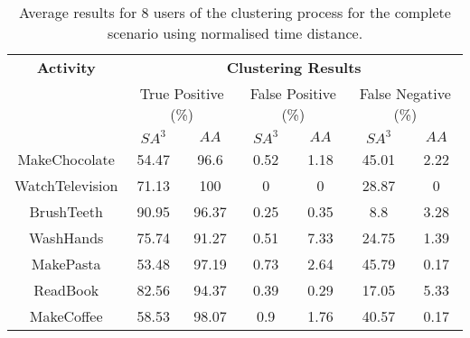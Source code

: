 \begin{table}[htbp]\scriptsize
  \begin{center}
        \begin{tabular}{ccccccc}
            \hline            
            \textbf{Activity} & \multicolumn{6}{c}{\textbf{Clustering Results}} \\
             & \multicolumn{2}{c}{True Positive (\%)} & \multicolumn{2}{c}{False Positive (\%)} & \multicolumn{2}{c}{False Negative (\%)} \\
             & $SA^3$ & $AA$ & $SA^3$ & $AA$ & $SA^3$ & $AA$ \\
            \hline
            MakeChocolate   & 54.47 & 96.6  & 0.52 & 1.18 & 45.01 & 2.22 \\
	    WatchTelevision & 71.13 & 100   & 0    & 0    & 28.87 & 0    \\
	    BrushTeeth      & 90.95 & 96.37 & 0.25 & 0.35 & 8.8   & 3.28 \\
	    WashHands       & 75.74 & 91.27 & 0.51 & 7.33 & 24.75 & 1.39 \\
	    MakePasta       & 53.48 & 97.19 & 0.73 & 2.64 & 45.79 & 0.17 \\
	    ReadBook        & 82.56 & 94.37 & 0.39 & 0.29 & 17.05 & 5.33 \\
	    MakeCoffee      & 58.53 & 98.07 & 0.9  & 1.76 & 40.57 & 0.17 \\
            \hline
        \end{tabular}
        \caption{Average results for 8 users of the clustering process for the complete scenario using normalised time distance.}
        \label{tab-r-comp-t2}
    \end{center}
\end{table}


        
        
